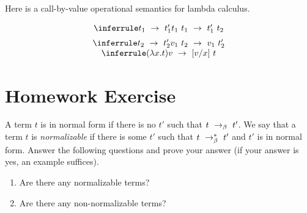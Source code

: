 Here is a call-by-value operational semantics for lambda calculus. 

\[
\begin{array}{c}
\infer{t_1~t_1 \red t_1'~t_2}{t_1 \red t_1'}\\[2mm]
\infer{v_1~t_2 \red v_1~t_2'}{t_2 \red t_2'}\\
\infer{(\l x.t) v \red [v/x]~t}{\strut}
\end{array}
\]

\section{Homework Exercise}
A term $t$ is in normal form if there is no $t'$ such that $t ~\rightarrow_{\beta}~
t'$.  We say that a term $t$ is \emph{normalizable} if there is some
$t'$ such that $t ~\rightarrow_{\beta}^{*}~ t'$ and $t'$ is in normal form.  Answer the
following questions and prove your answer (if your answer is yes, an
example suffices).

\begin{enumerate}
\item Are there any normalizable terms?
\item Are there any non-normalizable terms?
\end{enumerate}







